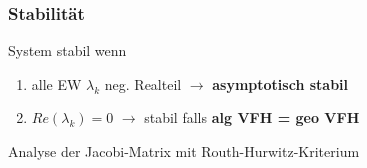 \documentclass[10pt,a4paper]{article}
\begin{document}
\subsubsection{Stabilität}
System stabil wenn
\begin{enumerate}
    \item alle EW $\lambda_k$ neg. Realteil $\rightarrow$ \textbf{asymptotisch stabil}
    \item $Re(\lambda_k)=0$ $\rightarrow$ stabil falls \textbf{alg VFH = geo VFH}
\end{enumerate}
Analyse der Jacobi-Matrix mit Routh-Hurwitz-Kriterium
\end{document}
